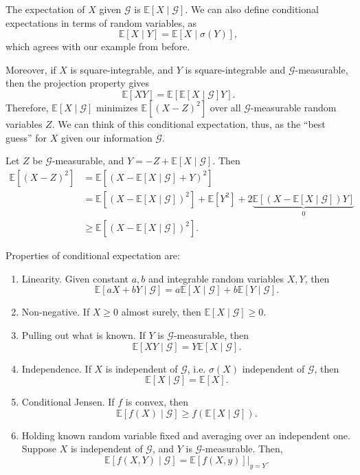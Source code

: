 \documentclass[12pt]{article}
\begin{document}
The expectation of $X$ given $\mathcal{G}$ is $\mathbb{E}[X\mid\mathcal{G}]$. We can also define conditional expectations in terms of random variables, as
\[
\mathbb{E}[X \mid Y] = \mathbb{E}[X \mid \sigma(Y)],
\]
which agrees with our example from before.

Moreover, if $X$ is square-integrable, and $Y$ is square-integrable and $\mathcal{G}$-measurable, then the projection property gives
\[
\mathbb{E}[XY] = \mathbb{E}[\mathbb{E}[X \mid \mathcal{G}] Y].
\]
Therefore, $\mathbb{E}[X \mid \mathcal{G}]$ minimizes $\mathbb{E}[(X - Z)^2]$ over all $\mathcal{G}$-measurable random variables $Z$. We can think of this conditional expectation, thus, as the ``best guess'' for $X$ given our information $\mathcal{G}$.

\begin{proofbox}
	Let $Z$ be $\mathcal{G}$-measurable, and $Y = -Z + \mathbb{E}[X \mid \mathcal{G}]$. Then
	\begin{align*}
		\mathbb{E}[(X - Z)^2] &= \mathbb{E}[(X - \mathbb{E}[X\mid\mathcal{G}] + Y)^2] \\
				      &= \mathbb{E}[(X - \mathbb{E}[X \mid \mathcal{G}])^2] + \mathbb{E}[Y^2] + 2 \underbrace{\mathbb{E}[(X - \mathbb{E}[X \mid \mathcal{G}]) Y]}_{0} \\
				      &\geq \mathbb{E}[(X - \mathbb{E}[X \mid \mathcal{G}])^2].
	\end{align*}
\end{proofbox}


Properties of conditional expectation are:
\begin{enumerate}
	\item Linearity. Given constant $a, b$ and integrable random variables $X, Y$, then
		\[
		\mathbb{E}[aX + bY \mid \mathcal{G}] = a \mathbb{E}[X\mid\mathcal{G}] + b \mathbb{E}[Y\mid\mathcal{G}].
		\]
	\item Non-negative. If $X \geq 0$ almost surely, then $\mathbb{E}[X \mid \mathcal{G}] \geq 0$.
	\item Pulling out what is known. If $Y$ is $\mathcal{G}$-measurable, then
		\[
		\mathbb{E}[XY \mid \mathcal{G}] = Y \mathbb{E}[X \mid \mathcal{G}].
		\]
	\item Independence. If $X$ is independent of $\mathcal{G}$, i.e. $\sigma(X)$ independent of $\mathcal{G}$, then
		\[
		\mathbb{E}[X \mid \mathcal{G}] = \mathbb{E}[X].
		\]
	\item Conditional Jensen. If $f$ is convex, then
		\[
		\mathbb{E}[f(X) \mid \mathcal{G}] \geq f(\mathbb{E}[X \mid \mathcal{G}]).
		\]
	\item Holding known random variable fixed and averaging over an independent one. Suppose $X$ is independent of $\mathcal{G}$, and $Y$ is $\mathcal{G}$-measurable. Then,
		\[
		\mathbb{E}[f(X, Y) \mid \mathcal{G}] = \mathbb{E}[f(X, y)] \biggr|_{y = Y}.
		\]
\end{enumerate}
\end{document}
